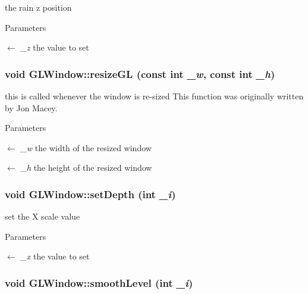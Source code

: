 the rain z position 
\begin{DoxyParams}{Parameters}
\item[\mbox{$\leftarrow$} {\em \_\-z}]the value to set \end{DoxyParams}
\hypertarget{classGLWindow_abe57c0f40e59cba4c98759121e22eb47}{
\subsubsection[{resizeGL}]{\setlength{\rightskip}{0pt plus 5cm}void GLWindow::resizeGL (const int {\em \_\-w}, \/  const int {\em \_\-h})}}
\label{classGLWindow_abe57c0f40e59cba4c98759121e22eb47}


this is called whenever the window is re-\/sized This function was originally written by Jon Macey.


\begin{DoxyParams}{Parameters}
\item[\mbox{$\leftarrow$} {\em \_\-w}]the width of the resized window \item[\mbox{$\leftarrow$} {\em \_\-h}]the height of the resized window \end{DoxyParams}
\hypertarget{classGLWindow_aa977ee3b936a08d1dfc675ac8a2eccad}{
\subsubsection[{setDepth}]{\setlength{\rightskip}{0pt plus 5cm}void GLWindow::setDepth (int {\em \_\-i})}}
\label{classGLWindow_aa977ee3b936a08d1dfc675ac8a2eccad}


set the X scale value 
\begin{DoxyParams}{Parameters}
\item[\mbox{$\leftarrow$} {\em \_\-x}]the value to set \end{DoxyParams}
\hypertarget{classGLWindow_a2064b4f973be3388c40bedb9ba27df1f}{
\subsubsection[{smoothLevel}]{\setlength{\rightskip}{0pt plus 5cm}void GLWindow::smoothLevel (int {\em \_\-i})}}
\label{classGLWindow_a2064b4f973be3388c40bedb9ba27df1f}


